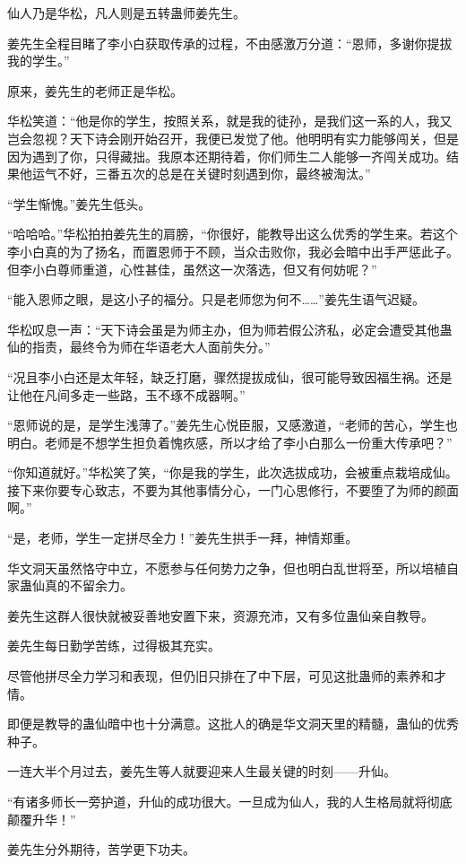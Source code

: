 \begin{this_body}
仙人乃是华松，凡人则是五转蛊师姜先生。

姜先生全程目睹了李小白获取传承的过程，不由感激万分道：“恩师，多谢你提拔我的学生。”

原来，姜先生的老师正是华松。

华松笑道：“他是你的学生，按照关系，就是我的徒孙，是我们这一系的人，我又岂会忽视？天下诗会刚开始召开，我便已发觉了他。他明明有实力能够闯关，但是因为遇到了你，只得藏拙。我原本还期待着，你们师生二人能够一齐闯关成功。结果他运气不好，三番五次的总是在关键时刻遇到你，最终被淘汰。”

“学生惭愧。”姜先生低头。

“哈哈哈。”华松拍拍姜先生的肩膀，“你很好，能教导出这么优秀的学生来。若这个李小白真的为了扬名，而置恩师于不顾，当众击败你，我必会暗中出手严惩此子。但李小白尊师重道，心性甚佳，虽然这一次落选，但又有何妨呢？”

“能入恩师之眼，是这小子的福分。只是老师您为何不……”姜先生语气迟疑。

华松叹息一声：“天下诗会虽是为师主办，但为师若假公济私，必定会遭受其他蛊仙的指责，最终令为师在华语老大人面前失分。”

“况且李小白还是太年轻，缺乏打磨，骤然提拔成仙，很可能导致因福生祸。还是让他在凡间多走一些路，玉不琢不成器啊。”

“恩师说的是，是学生浅薄了。”姜先生心悦臣服，又感激道，“老师的苦心，学生也明白。老师是不想学生担负着愧疚感，所以才给了李小白那么一份重大传承吧？”

“你知道就好。”华松笑了笑，“你是我的学生，此次选拔成功，会被重点栽培成仙。接下来你要专心致志，不要为其他事情分心，一门心思修行，不要堕了为师的颜面啊。”

“是，老师，学生一定拼尽全力！”姜先生拱手一拜，神情郑重。

华文洞天虽然恪守中立，不愿参与任何势力之争，但也明白乱世将至，所以培植自家蛊仙真的不留余力。

姜先生这群人很快就被妥善地安置下来，资源充沛，又有多位蛊仙亲自教导。

姜先生每日勤学苦练，过得极其充实。

尽管他拼尽全力学习和表现，但仍旧只排在了中下层，可见这批蛊师的素养和才情。

即便是教导的蛊仙暗中也十分满意。这批人的确是华文洞天里的精髓，蛊仙的优秀种子。

一连大半个月过去，姜先生等人就要迎来人生最关键的时刻——升仙。

“有诸多师长一旁护道，升仙的成功很大。一旦成为仙人，我的人生格局就将彻底颠覆升华！”

姜先生分外期待，苦学更下功夫。


\end{this_body}
